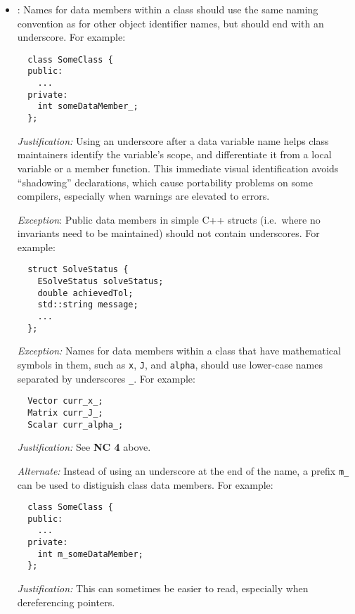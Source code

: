 \begin{itemize}
\item\NCDataMemberNames: Names for data members within a class should
  use the same naming convention as for other object identifier names,
  but should end with an underscore.  For example:

{\small\begin{verbatim}
  class SomeClass {
  public:
    ...
  private:
    int someDataMember_;
  };
\end{verbatim}}

  \textit{Justification:} Using an underscore after a data variable
  name helps class maintainers identify the variable's scope, and
  differentiate it from a local variable or a member function.  This
  immediate visual identification avoids ``shadowing'' declarations,
  which cause portability problems on some compilers, especially when
  warnings are elevated to errors.

  \textit{Exception}: Public data members in simple C++ structs (i.e.\
  where no invariants need to be maintained) should not contain
  underscores.  For example:

{\small\begin{verbatim}
  struct SolveStatus {
    ESolveStatus solveStatus;
    double achievedTol;
    std::string message;
    ...
  };
\end{verbatim}}

  \textit{Exception:} Names for data members within a class that have
  mathematical symbols in them, such as {}\texttt{x}, {}\texttt{J},
  and {}\texttt{alpha}, should use lower-case names separated by
  underscores {}\texttt{\_}.  For example:

{\small\begin{verbatim}
  Vector curr_x_;
  Matrix curr_J_;
  Scalar curr_alpha_;
\end{verbatim}}

\textit{Justification:} See {}\textbf{NC 4} above.

\textit{Alternate:} Instead of using an underscore at the end of the name, a prefix {}\texttt{m\_} can be used to distiguish class data members.  For example:

{\small\begin{verbatim}
  class SomeClass {
  public:
    ...
  private:
    int m_someDataMember;
  };
\end{verbatim}}

\textit{Justification:}  This can sometimes be easier to read, especially when dereferencing pointers.

\end{itemize}


